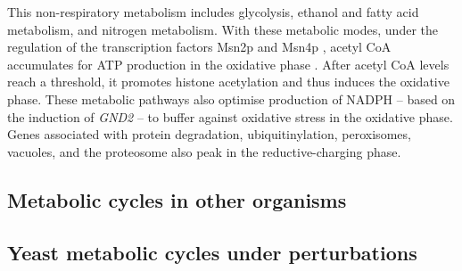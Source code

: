 \begin{enumerate}
  This non-respiratory metabolism includes glycolysis, ethanol and fatty acid metabolism, and nitrogen metabolism.
  With these metabolic modes, under the regulation of the transcription factors Msn2p and Msn4p \citep{kuangMsn2RegulateExpression2017}, acetyl CoA accumulates for ATP production in the oxidative phase \citep{tuLogicYeastMetabolic2005}.
After acetyl CoA levels reach a threshold, it promotes histone acetylation and thus induces the oxidative phase.
These metabolic pathways also optimise production of NADPH -- based on the induction of \emph{GND2} -- to buffer against oxidative stress in the oxidative phase.
Genes associated with protein degradation, ubiquitinylation, peroxisomes, vacuoles, and the proteosome also peak in the reductive-charging phase.
\end{enumerate}


\subsection{Metabolic cycles in other organisms}
\label{subsec:intro-ymc-other_organisms}

\subsection{Yeast metabolic cycles under perturbations}
\label{subsec:intro-ymc-perturbations}

